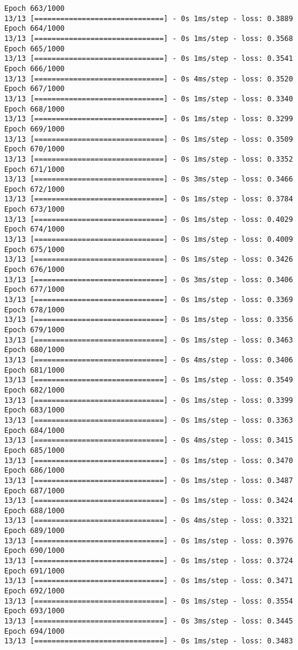 \documentclass[11pt]{article}
\begin{document}
\begin{Verbatim}[commandchars=\\\{\}]
Epoch 663/1000
13/13 [==============================] - 0s 1ms/step - loss: 0.3889
Epoch 664/1000
13/13 [==============================] - 0s 1ms/step - loss: 0.3568
Epoch 665/1000
13/13 [==============================] - 0s 1ms/step - loss: 0.3541
Epoch 666/1000
13/13 [==============================] - 0s 4ms/step - loss: 0.3520
Epoch 667/1000
13/13 [==============================] - 0s 1ms/step - loss: 0.3340
Epoch 668/1000
13/13 [==============================] - 0s 1ms/step - loss: 0.3299
Epoch 669/1000
13/13 [==============================] - 0s 1ms/step - loss: 0.3509
Epoch 670/1000
13/13 [==============================] - 0s 1ms/step - loss: 0.3352
Epoch 671/1000
13/13 [==============================] - 0s 3ms/step - loss: 0.3466
Epoch 672/1000
13/13 [==============================] - 0s 1ms/step - loss: 0.3784
Epoch 673/1000
13/13 [==============================] - 0s 1ms/step - loss: 0.4029
Epoch 674/1000
13/13 [==============================] - 0s 1ms/step - loss: 0.4009
Epoch 675/1000
13/13 [==============================] - 0s 1ms/step - loss: 0.3426
Epoch 676/1000
13/13 [==============================] - 0s 3ms/step - loss: 0.3406
Epoch 677/1000
13/13 [==============================] - 0s 1ms/step - loss: 0.3369
Epoch 678/1000
13/13 [==============================] - 0s 1ms/step - loss: 0.3356
Epoch 679/1000
13/13 [==============================] - 0s 1ms/step - loss: 0.3463
Epoch 680/1000
13/13 [==============================] - 0s 4ms/step - loss: 0.3406
Epoch 681/1000
13/13 [==============================] - 0s 1ms/step - loss: 0.3549
Epoch 682/1000
13/13 [==============================] - 0s 1ms/step - loss: 0.3399
Epoch 683/1000
13/13 [==============================] - 0s 1ms/step - loss: 0.3363
Epoch 684/1000
13/13 [==============================] - 0s 4ms/step - loss: 0.3415
Epoch 685/1000
13/13 [==============================] - 0s 1ms/step - loss: 0.3470
Epoch 686/1000
13/13 [==============================] - 0s 1ms/step - loss: 0.3487
Epoch 687/1000
13/13 [==============================] - 0s 1ms/step - loss: 0.3424
Epoch 688/1000
13/13 [==============================] - 0s 4ms/step - loss: 0.3321
Epoch 689/1000
13/13 [==============================] - 0s 1ms/step - loss: 0.3976
Epoch 690/1000
13/13 [==============================] - 0s 1ms/step - loss: 0.3724
Epoch 691/1000
13/13 [==============================] - 0s 1ms/step - loss: 0.3471
Epoch 692/1000
13/13 [==============================] - 0s 1ms/step - loss: 0.3554
Epoch 693/1000
13/13 [==============================] - 0s 3ms/step - loss: 0.3445
Epoch 694/1000
13/13 [==============================] - 0s 1ms/step - loss: 0.3483

\end{Verbatim}
\end{document}
